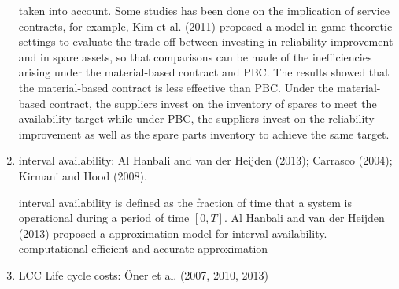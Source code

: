 \documentclass[preprint,12pt]{elsarticle}
\begin{document}
\begin{enumerate}
taken into account. Some studies has been done on the implication of service contracts, for example, Kim et al. (2011) proposed a model in game-theoretic settings to evaluate the trade-off between investing in reliability improvement and in spare assets, so that comparisons can be made of the inefficiencies arising under the material-based contract and PBC. The results showed that the material-based contract is less effective than PBC. Under the material-based contract, the suppliers invest on the inventory of spares to meet the availability target while under PBC, the suppliers invest on the reliability improvement as well as the spare parts inventory to achieve the same target.

 \item {interval availability}: Al Hanbali and van der Heijden (2013); Carrasco (2004); Kirmani and Hood (2008).

 interval availability is defined as the fraction of time that a system is operational during a period of time $[0,T]$. Al Hanbali and van der Heijden (2013) proposed a approximation model for interval availability.
 computational efficient and accurate approximation

\item LCC Life cycle costs:  \"{O}ner et al. (2007, 2010, 2013)


\end{enumerate}
\end{document}
